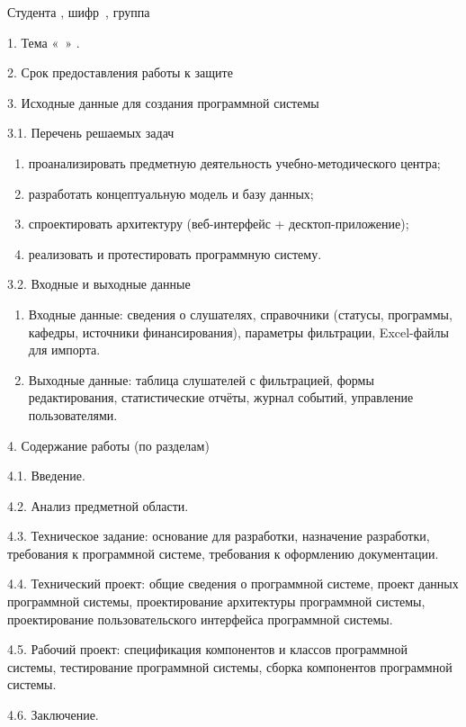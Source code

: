 {\parindent0pt
  Студента , шифр\ , группа 
  
1. Тема «\ »
\fi.

2. Срок предоставления работы к защите 

3. Исходные данные для создания программной системы

3.1. Перечень решаемых задач
\renewcommand\labelenumi{\theenumi)}
\begin{enumerate}
	\item проанализировать предметную деятельность учебно-методического центра;
	\item разработать концептуальную модель и базу данных;
	\item спроектировать архитектуру (веб-интерфейс + десктоп-приложение);
	\item реализовать и протестировать программную систему.
\end{enumerate}


3.2. Входные и выходные данные
\begin{enumerate}
	\item {Входные данные:}
сведения о слушателях, справочники (статусы, программы, кафедры, источники финансирования), параметры фильтрации, Excel-файлы для импорта.
	\item {Выходные данные:}
таблица слушателей с фильтрацией, формы редактирования, статистические отчёты, журнал событий, управление пользователями.
\end{enumerate}



4. Содержание работы (по разделам)

 4.1. Введение.
 
 4.2. Анализ предметной области.
 
 4.3. Техническое задание: основание для разработки, назначение разработки,
 требования к программной системе, требования к оформлению документации.
 
 4.4. Технический проект: общие сведения о программной системе, проект
 данных программной системы, проектирование архитектуры программной системы, проектирование пользовательского интерфейса программной системы.
 
 4.5. Рабочий проект: спецификация компонентов и классов программной системы, тестирование программной системы, сборка компонентов программной системы.
 
 4.6. Заключение.
 
}
